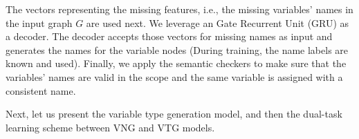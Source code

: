 The vectors representing the missing features, i.e., the missing
variables' names in the input graph $G$ are used next.  We leverage an
Gate Recurrent Unit (GRU) as a decoder.
The decoder accepts those vectors for missing names as input and
generates the names for the variable nodes (During training, the name
labels are known and used). Finally, we apply the semantic checkers to
make sure that the variables' names are valid in the scope and 
the same variable is assigned with a consistent name.



Next, let us present the variable type generation model, and then
the dual-task learning scheme between VNG and VTG models.









